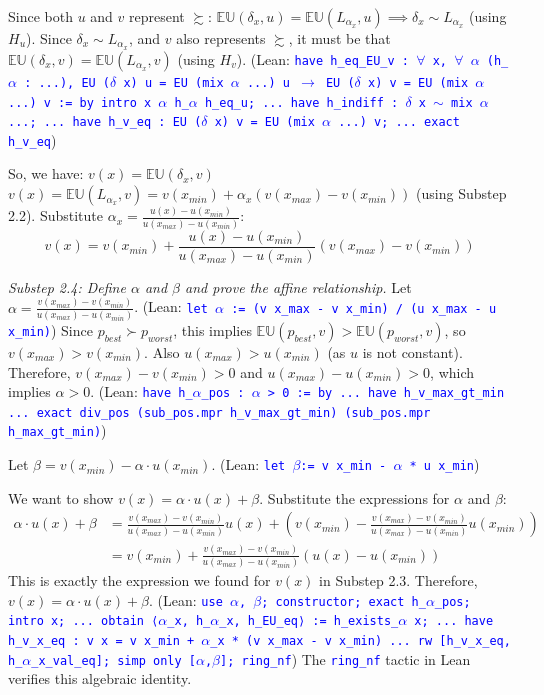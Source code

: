 \documentclass{article}
\theoremstyle{definition}
\newcommand{\EU}{\mathbb{EU}}
\newcommand{\tactic}[1]{\textcolor{blue}{\texttt{#1}}}
\newcommand{\pref}{\succsim} %
\newcommand{\strictpref}{\succ} %
\newcommand{\indiff}{\sim} %
\begin{document}
    Since both $u$ and $v$ represent $\pref$:
    $\EU(\delta_x, u) = \EU(L_{\alpha_x}, u) \implies \delta_x \indiff L_{\alpha_x}$ (using $H_u$).
    Since $\delta_x \indiff L_{\alpha_x}$, and $v$ also represents $\pref$, it must be that $\EU(\delta_x, v) = \EU(L_{\alpha_x}, v)$ (using $H_v$).
    (Lean: \tactic{have h\_eq\_EU\_v : $\forall$ x, $\forall$ $\alpha$ (h\_$\alpha$ : ...), EU ($\delta$ x) u = EU (mix $\alpha$ ...) u $\rightarrow$ EU ($\delta$ x) v = EU (mix $\alpha$ ...) v := by intro x $\alpha$ h\_$\alpha$ h\_eq\_u; ... have h\_indiff : $\delta$ x $\sim$ mix $\alpha$ ...; ... have h\_v\_eq : EU ($\delta$ x) v = EU (mix $\alpha$ ...) v; ... exact h\_v\_eq})

    So, we have:
    $v(x) = \EU(\delta_x, v)$
    $v(x) = \EU(L_{\alpha_x}, v) = v(x_{min}) + \alpha_x (v(x_{max}) - v(x_{min}))$ (using Substep 2.2).
    Substitute $\alpha_x = \frac{u(x) - u(x_{min})}{u(x_{max}) - u(x_{min})}$:
    \[ v(x) = v(x_{min}) + \frac{u(x) - u(x_{min})}{u(x_{max}) - u(x_{min})} (v(x_{max}) - v(x_{min})) \]

    \textit{Substep 2.4: Define $\alpha$ and $\beta$ and prove the affine relationship.}
    Let $\alpha = \frac{v(x_{max}) - v(x_{min})}{u(x_{max}) - u(x_{min})}$.
    (Lean: \tactic{let $\alpha$ := (v x\_max - v x\_min) / (u x\_max - u x\_min)})
    Since $p_{best} \strictpref p_{worst}$, this implies $\EU(p_{best},v) > \EU(p_{worst},v)$, so $v(x_{max}) > v(x_{min})$.
    Also $u(x_{max}) > u(x_{min})$ (as $u$ is not constant).
    Therefore, $v(x_{max}) - v(x_{min}) > 0$ and $u(x_{max}) - u(x_{min}) > 0$, which implies $\alpha > 0$.
    (Lean: \tactic{have h\_$\alpha$\_pos : $\alpha$ > 0 := by ... have h\_v\_max\_gt\_min ... exact div\_pos (sub\_pos.mpr h\_v\_max\_gt\_min) (sub\_pos.mpr h\_max\_gt\_min)})

    Let $\beta = v(x_{min}) - \alpha \cdot u(x_{min})$.
    (Lean: \tactic{let $\beta$:= v x\_min - $\alpha$ * u x\_min})

    We want to show $v(x) = \alpha \cdot u(x) + \beta$.
    Substitute the expressions for $\alpha$ and $\beta$:
    \begin{align*}
    \alpha \cdot u(x) + \beta &= \frac{v(x_{max}) - v(x_{min})}{u(x_{max}) - u(x_{min})} u(x) + \left( v(x_{min}) - \frac{v(x_{max}) - v(x_{min})}{u(x_{max}) - u(x_{min})} u(x_{min}) \right) \\
    &= v(x_{min}) + \frac{v(x_{max}) - v(x_{min})}{u(x_{max}) - u(x_{min})} (u(x) - u(x_{min}))
    \end{align*}
    This is exactly the expression we found for $v(x)$ in Substep 2.3.
    Therefore, $v(x) = \alpha \cdot u(x) + \beta$.
    (Lean: \tactic{use $\alpha$, $\beta$; constructor; exact h\_$\alpha$\_pos; intro x; ... obtain ⟨$\alpha$\_x, h\_$\alpha$\_x, h\_EU\_eq⟩ := h\_exists\_$\alpha$ x; ... have h\_v\_x\_eq : v x = v x\_min + $\alpha$\_x * (v x\_max - v x\_min) ... rw [h\_v\_x\_eq, h\_$\alpha$\_x\_val\_eq]; simp only [$\alpha$,$\beta$]; ring\_nf})
    The \tactic{ring\_nf} tactic in Lean verifies this algebraic identity.
\end{document}
